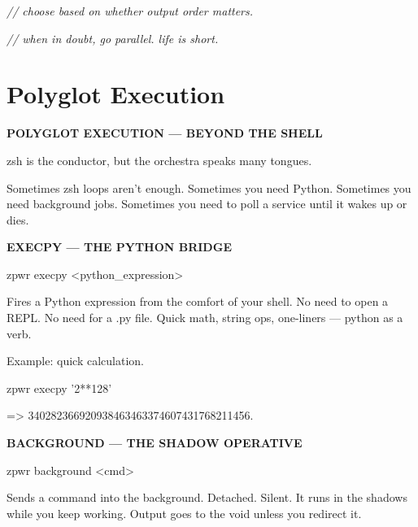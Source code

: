 \documentclass[11pt,a4paper,twoside]{book}
\begin{document}
{\small\itshape\color{dimtext} // choose based on whether output order matters.}

{\small\itshape\color{dimtext} // when in doubt, go parallel. life is short.}


\vspace{16pt}

\section{Polyglot Execution}


\vspace{10pt}
{\large\bfseries\color{neoncyan} POLYGLOT EXECUTION — BEYOND THE SHELL}\vspace{6pt}

zsh is the conductor, but the orchestra speaks many tongues.

Sometimes zsh loops aren't enough. Sometimes you need Python. Sometimes you need background jobs. Sometimes you need to poll a service until it wakes up or dies.


\vspace{12pt}
{\bfseries\color{neonyellow} EXECPY — THE PYTHON BRIDGE}\vspace{4pt}

\begin{codebox}
\color{neongreen}zpwr execpy <python\_expression>\\
\end{codebox}

Fires a Python expression from the comfort of your shell. No need to open a REPL. No need for a .py file. Quick math, string ops, one-liners — python as a verb.

Example: quick calculation.

\begin{codebox}
\color{neongreen}zpwr execpy '2**128'\\
\end{codebox}

=> 340282366920938463463374607431768211456.


\vspace{12pt}
{\bfseries\color{neonyellow} BACKGROUND — THE SHADOW OPERATIVE}\vspace{4pt}

\begin{codebox}
\color{neongreen}zpwr background <cmd>\\
\end{codebox}

Sends a command into the background. Detached. Silent. It runs in the shadows while you keep working. Output goes to the void unless you redirect it.
\end{document}
